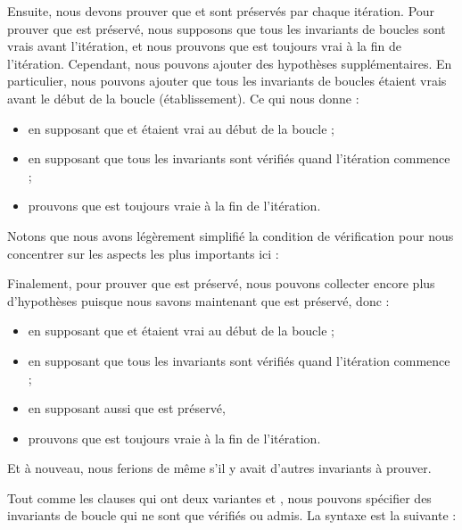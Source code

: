 Ensuite, nous devons prouver que  et  sont
préservés par chaque itération. Pour prouver que  est préservé,
nous supposons que tous les invariants de boucles sont vrais avant l'itération,
et nous prouvons que  est toujours vrai à la fin de l'itération.
Cependant, nous pouvons ajouter des hypothèses supplémentaires. En particulier,
nous pouvons ajouter que tous les invariants de boucles étaient vrais avant le
début de la boucle (établissement). Ce qui nous donne :
\begin{itemize}
  \item en supposant que  et  étaient vrai au
        début de la boucle ;
  \item en supposant que tous les invariants sont vérifiés quand l'itération
        commence ;
  \item prouvons que  est toujours vraie à la fin de l'itération.
\end{itemize}
Notons que nous avons légèrement simplifié la condition de vérification pour
nous concentrer sur les aspects les plus importants ici :




Finalement, pour prouver que  est préservé, nous pouvons
collecter encore plus d'hypothèses puisque nous savons maintenant que
 est préservé, donc :
\begin{itemize}
  \item en supposant que  et  étaient vrai au
        début de la boucle ;
  \item en supposant que tous les invariants sont vérifiés quand l'itération
        commence ;
  \item en supposant aussi que  est préservé,
  \item prouvons que  est toujours vraie à la fin de l'itération.
\end{itemize}
Et à nouveau, nous ferions de même s'il y avait d'autres invariants à prouver.




\label{l3:statements-loops-inv-kinds}


Tout comme les clauses  qui ont deux variantes
 et , nous pouvons spécifier des invariants
de boucle qui ne sont que vérifiés ou admis. La syntaxe est la suivante :


